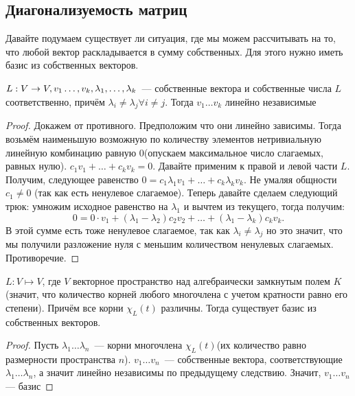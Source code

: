 \subsection{Диагонализуемость матриц}
\begin{motivation}
    Давайте подумаем существует ли ситуация, где мы можем рассчитывать на то, что любой вектор раскладывается в сумму собственных.
    Для этого нужно иметь базис из собственных векторов.
\end{motivation}
\begin{theorem}
    $L: V\rightarrow V, v_1\dots, v_k,\\ \lambda_1, \dots, \lambda_k$~---
    собственные вектора и собственные числа $L$ соответственно, причём
    $\lambda_i\not= \lambda_j \forall i\not= j$.
    Тогда $v_1\dots v_k$ линейно независимые
\end{theorem}
\begin{proof}
    Докажем от противного. Предположим что они линейно зависимы. Тогда возьмём наименьшую возможную по количеству элементов
    нетривиальную линейную комбинацию равную 0(опускаем максимальное число слагаемых, равных нулю).
    $c_1v_1+\dots+c_k v_k = 0$. Давайте применим к правой и левой части $L$. Получим, следующее равенство
    $0 = c_1\lambda_1v_1+\dots + c_k\lambda_k v_k$. Не умаляя общности $c_1\not=0$ (так как есть ненулевое слагаемое).
    Теперь давайте сделаем следующий трюк: умножим исходное равенство на $\lambda_1$ и вычтем из текущего, тогда получим:
    \[
    0 = 0\cdot v_1 + (\lambda_1 - \lambda_2)c_2v_2 + \dots + (\lambda_1 - \lambda_k) c_k v_k
    .\]
    В этой сумме есть тоже ненулевое слагаемое, так как $\lambda_i \not= \lambda_j$ но это значит, что мы получили
    разложение нуля с меньшим количеством ненулевых слагаемых. Противоречие.
\end{proof}
\begin{follow}
    $L\colon V \mapsto V$, где $V$ векторное пространство над алгебраически замкнутым полем $K$(значит, что количество корней
    любого многочлена с учетом кратности равно его степени).
    Причём все корни $\chi_L(t)$ различны.
    Тогда существует базис из собственных векторов.
\end{follow}
\begin{proof}
    Пусть $\lambda_1\dots \lambda_n$~--- корни многочлена $\chi_L(t)$(их количество равно размерности пространства $n$).
    $v_1\dots v_n$~--- собственные вектора, соответствующие $\lambda_1\dots \lambda_n$,
    а значит линейно независимы по предыдущему следствию. Значит, $v_1\dots v_n$ --- базис 
\end{proof}
